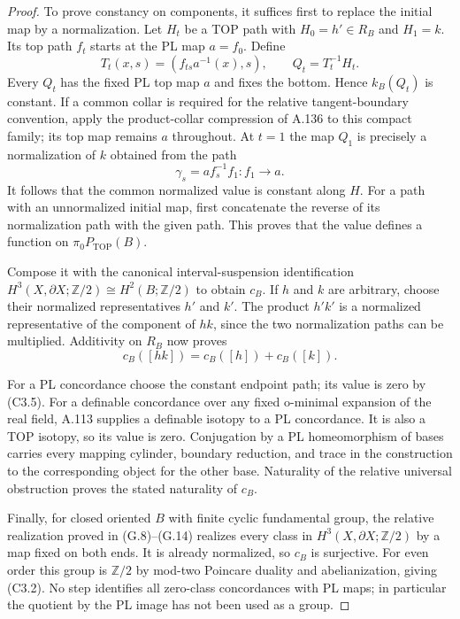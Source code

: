 \begin{proof}
To prove constancy on components, it suffices first to replace the
initial map by a normalization. Let $H_t$ be a TOP path with
$H_0=h'\in R_B$ and $H_1=k$. Its top path $f_t$ starts at the PL map
$a=f_0$. Define
\[
 T_t(x,s)=(f_{ts}a^{-1}(x),s),\qquad Q_t=T_t^{-1}H_t.
                                                        \tag{C3.11}
\]
Every $Q_t$ has the fixed PL top map $a$ and fixes the bottom. Hence
$k_B(Q_t)$ is constant. If a common collar is required for the
relative tangent-boundary convention, apply the product-collar
compression of A.136 to this compact family; its top map remains
$a$ throughout. At $t=1$ the map $Q_1$ is precisely a normalization
of $k$ obtained from the path
\[
                  \gamma_s=a f_s^{-1}f_1:f_1\longrightarrow a.
                                                        \tag{C3.12}
\]
It follows that the common normalized value is constant along $H$.
For a path with an unnormalized initial map, first concatenate the
reverse of its normalization path with the given path. This proves
that the value defines a function on $\pi_0P_{\mathrm{TOP}}(B)$.

Compose it with the canonical interval-suspension identification
$H^3(X,\partial X;\mathbb Z/2)\cong H^2(B;\mathbb Z/2)$ to obtain
$c_B$. If $h$ and $k$ are arbitrary, choose their normalized
representatives $h'$ and $k'$. The product $h'k'$ is a normalized
representative of the component of $hk$, since the two normalization
paths can be multiplied. Additivity on $R_B$ now proves
\[
                        c_B([hk])=c_B([h])+c_B([k]).
                                                        \tag{C3.13}
\]

For a PL concordance choose the constant endpoint path; its value is
zero by (C3.5). For a definable concordance over any fixed o-minimal
expansion of the real field, A.113 supplies a definable isotopy to a
PL concordance. It is also a TOP isotopy, so its value is zero.
Conjugation by a PL homeomorphism of bases carries every mapping
cylinder, boundary reduction, and trace in the construction to the
corresponding object for the other base. Naturality of the relative
universal obstruction proves the stated naturality of $c_B$.

Finally, for closed oriented $B$ with finite cyclic fundamental group,
the relative realization proved in (G.8)--(G.14) realizes every class
in $H^3(X,\partial X;\mathbb Z/2)$ by a map fixed on both ends.
It is already normalized, so $c_B$ is surjective. For even order this
group is $\mathbb Z/2$ by mod-two Poincare duality and abelianization,
giving (C3.2). No step identifies all zero-class concordances with PL
maps; in particular the quotient by the PL image has not been used
as a group.
\end{proof}
